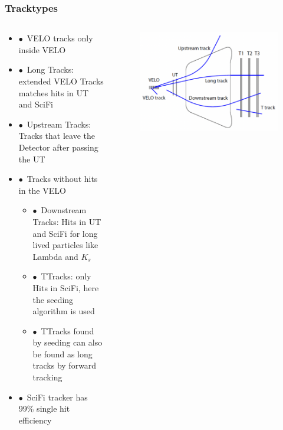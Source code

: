 \documentclass[aspectratio=1610, 12pt, xcolor=dvipsnames]{beamer}
\begin{document}
\begin{frame}\frametitle{Tracktypes}
  \begin{columns}
    \begin{column}[c]{0.48\textwidth}  
      \begin{itemize}
        \item $\bullet$\, VELO tracks only inside VELO
        \item $\bullet$\, Long Tracks: extended VELO Tracks matches hits in UT and SciFi
        \item $\bullet$\, Upstream Tracks: Tracks that leave the Detector after passing the UT
        \item $\bullet$\, Tracks without hits in the VELO
        \begin{itemize}
          \item $\bullet$\, Downstream Tracks: Hits in UT and SciFi for long lived particles like Lambda and $K_s$
          \item $\bullet$\, TTracks: only Hits in SciFi, here the seeding algorithm is used
          \item $\bullet$\, TTracks found by seeding can also be found as long tracks by forward tracking
        \end{itemize}
        \item $\bullet$\, \to SciFi tracker has 99\% single hit efficiency
      \end{itemize}
    \end{column}
    \begin{column}[c]{0.48\textwidth}
      \begin{figure}
        \centering
        \includegraphics[width=\textwidth]{plots/track_types.png}
      \end{figure}
    \end{column}
  \end{columns}
\end{frame}
\end{document}
